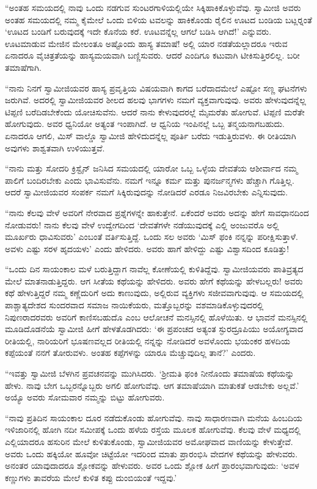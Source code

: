  “ಅಂತಹ ಸಮಯದಲ್ಲಿ ನಾವು ಒಂದು ನಡಗುವ ಸುಂಟರಗಾಳಿಯಲ್ಲಿಯೇ ಸಿಕ್ಕಿಹಾಕಿಕೊಳ್ಳುವೆವು. ಸ್ವಾಮೀಜಿ ಅವರು ಅಂತಹ ಸಮಯದಲ್ಲಿ ನಮ್ಮ ಕೈಮೇಲೆ ಒಂದು ಬಿಳಿಯ ಟವಲನ್ನು ಹಾಕಿಕೊಂಡು ರೈಲಿನ ಊಟದ ಬಂಡಿಯ ಬಟ್ಲರ್‍ನಂತೆ ‘ಊಟದ ಬಂಡಿಗೆ ಬರುವುದಕ್ಕೆ ಇದೇ ಕೊನೆಯ ಕರೆ. ಊಟವನ್ನೆಲ್ಲ ಆಗಲೆ ಬಡಿಸಿ ಆಗಿದೆ!’ ಎನ್ನುವರು. ಊಟಮಾಡುವ ಮೇಜಿನ ಮೇಲಂತೂ ಅಷ್ಟೊಂದು ಹಾಸ್ಯ ತಮಾಷೆ! ಅಲ್ಲಿ ಯಾರ ನಡತೆಯಲ್ಲಾದರೂ ಇರುವ ಏನಾದರೂ ವೈಚಿತ್ರತೆಯನ್ನು ಹಾಸ್ಯಮಯವಾಗಿ ಬಣ್ಣಿಸುವರು. ಆದರೆ ಎಂದಿಗೂ ಕಟುವಾಗಿ ಟೀಕಿಸುತ್ತಿರಲಿಲ್ಲ. ಬರೀ ತಮಾಷೆಗಾಗಿ.

 “ನಾನು ನಿನಗೆ ಸ್ವಾಮೀಜಿಯವರ ಹಾಸ್ಯ ಪ್ರವೃತ್ತಿಯ ವಿಷಯವಾಗಿ ಕಾಗದ ಬರೆದಾದಮೇಲೆ ಎಷ್ಟೋ ಸಣ್ಣ ಘಟನೆಗಳು ಜರುಗಿವೆ. ಅದರಲ್ಲಿ ಸ್ವಾಮೀಜಿಯವರ ಶೀಲದ ಹಲವು ಭಾಗಗಳು ನಮಗೆ ವ್ಯಕ್ತವಾಗುವುವು. ಅವರು ಹೇಳುವುದನ್ನೆಲ್ಲ ಟಿಪ್ಪಣಿ ಬರೆದಿಡಬೇಕೆಂದು ಯೋಚಿಸುವೆನು. ಆದರೆ ನಾನು ಕೇಳುವುದರಲ್ಲೆ ಮೈಮರೆತು ಹೋಗುವೆ. ಟಿಪ್ಪಣಿ ಮರೆತೇ ಹೋಗುವುದು. ಅವರ ಧ್ವನಿಯೋ ಅತ್ಯಂತ ಇಂಪಾಗಿದೆ. ಆ ಧ್ವನಿಯ ಇಂಪಿನಲ್ಲೆ ಒಬ್ಬ ತನ್ಮಯನಾಗಬಹುದು. ಏನಾದರೂ ಆಗಲಿ, ಮಿಸ್ ವಾಲ್ಡೊ ಸ್ವಾಮೀಜಿ ಹೇಳಿದುದನ್ನೆಲ್ಲ ಪೂರ್ತಿ ಬರೆದು ಇಡುತ್ತಿರುವಳು. ಈ ರೀತಿಯಾಗಿ ಅವುಗಳು ಶಾಶ್ವತವಾಗಿ ಉಳಿಯುತ್ತವೆ.

 “ನಾನು ಮತ್ತು ಸೋದರಿ ಕ್ರಿಸ್ಟೈನ್ ಜನಿಸಿದ ಸಮಯದಲ್ಲಿ ಯಾರೋ ಒಬ್ಬ ಒಳ್ಳೆಯ ದೇವತೆಯ ಆಶೀರ್ವಾದ ನಮ್ಮ ಪಾಲಿಗೆ ಬಂದಿರಬೇಕು ಎಂದು ಭಾವಿಸುವೆನು. ನಮಗೆ ಇನ್ನೂ ಕರ್ಮ ಮತ್ತು ಪುನರ್ಜನ್ಮಗಳು ಹೆಚ್ಚಾಗಿ ಗೊತ್ತಿಲ್ಲ. ಆದರೆ ಸ್ವಾಮೀಜಿಯವರ ಸಂಪರ್ಕ ನಮಗೆ ಸಿಕ್ಕಿರುವುದನ್ನು ನೋಡಿದರೆ ಎರಡೂ ನಿಜವಿರಬೇಕು ಎನ್ನಿಸುವುದು.

 “ನಾನು ಕೆಲವು ವೇಳೆ ಅವರಿಗೆ ನೇರವಾದ ಪ್ರಶ್ನೆಗಳನ್ನೇ ಹಾಕುತ್ತೇನೆ. ಏಕೆಂದರೆ ಅವರು ಅದನ್ನು ಹೇಗೆ ಸಾವಧಾನದಿಂದ ನೋಡುವರು! ನಾನು ಕೆಲವು ವೇಳೆ ಉದ್ವೇಗದಿಂದ ‘ದೇವತೆಗಳೇ ನಡೆಯುವುದಕ್ಕೆ ಎಲ್ಲಿ ಅಂಜುವರೊ ಅಲ್ಲಿ ಮೂರ್ಖರು ಧಾವಿಸುವರು’ ಎಂಬಂತೆ ವರ್ತಿಸುತ್ತಿದ್ದೆ. ಒಂದು ಸಲ ಅವರು ‘ಮಿಸ್ ಫಂಕಿ ನನ್ನನ್ನು ಪರೀಕ್ಷಿಸುತ್ತಾಳೆ. ಅವಳು ಎಷ್ಟು ಸರಳ ಹೃದಯಳು’ ಎಂದು ಹೇಳಿದರು. ಅವರು ಹಾಗೆ ಹೇಳಿದ್ದು ಎಷ್ಟು ವಿಶ್ವಾಸದಿಂದ ಕೂಡಿತ್ತು!

 “ಒಂದು ದಿನ ಸಾಯಂಕಾಲ ಮಳೆ ಬರುತ್ತಿದ್ದಾಗ ನಾವೆಲ್ಲ ಕೋಣೆಯಲ್ಲಿ ಕುಳಿತಿದ್ದೆವು. ಸ್ವಾಮೀಜಿಯವರು ಪಾತಿವ್ರತ್ಯದ ಮೇಲೆ ಮಾತನಾಡುತ್ತಿದ್ದರು. ಆಗ ಸೀತೆಯ ಕಥೆಯನ್ನು ಹೇಳಿದರು. ಅವರು ಹೇಗೆ ಕಥೆಯನ್ನು ಹೇಳಬಲ್ಲರು! ಅವರು ಕಥೆ ಹೇಳುತ್ತಿದ್ದರೆ ನಮ್ಮ ಕಣ್ಣೆದುರಿಗೆ ಅದು ಕಾಣುವುದು, ಅಲ್ಲಿರುವ ವ್ಯಕ್ತಿಗಳು ಸಜೀವವಾಗುವುವು. ಆ ಸಮಯದಲ್ಲಿ ಪಾಶ್ಚಾತ್ಯದೇಶದ ಸುಂದರವಾದ ಸಮಾಜ ನಾಯಿಕೆಯರು, ಮತ್ತೊಬ್ಬರನ್ನು ವಶಮಾಡಿಕೊಳ್ಳುವುದರಲ್ಲಿ ನಿಪುಣರಾದರವರು ಅವರಿಗೆ ಕಾಣಿಸಬಹುದೊ ಎಂಬ ಆಲೋಚನೆ ಮನಸ್ಸಿನಲ್ಲಿ ಹೊಳೆಯಿತು. ಆ ಭಾವನೆ ಮನಸ್ಸಿನಲ್ಲಿ ಮೂಡಿದೊಡನೆಯೆ ಸ್ವಾಮೀಜಿ ಹೀಗೆ ಹೇಳತೊಡಗಿದರು: ‘ಈ ಪ್ರಪಂಚದ ಅತ್ಯಂತ ಸ್ಫುರದ್ರೂಪಿಯು ಅಯೋಗ್ಯವಾದ ರೀತಿಯಲ್ಲಿ, ನಾರಿಯರಿಗೆ ಭೂಷಣವಲ್ಲದ ರೀತಿಯಲ್ಲಿ ನನ್ನನ್ನು ನೋಡಿದರೆ ಅವಳೊಂದು ಭಯಂಕರ ಹಳದಿಯ ಕಪ್ಪೆಯಂತೆ ನನಗೆ ತೋರುವಳು. ಅಂತಹ ಕಪ್ಪೆಗಳನ್ನು ಯಾರೂ ಮೆಚ್ಚುವುದಿಲ್ಲ ತಾನೆ?’ ಎಂದರು.

 “ಇವತ್ತು ಸ್ವಾಮೀಜಿ ಬೆಳಗಿನ ಪ್ರವಚನವನ್ನು ಮುಗಿಸಿದರು. ‘ಶ‍್ರೀಮತಿ ಫಂಕಿ ನೀನೊಂದು ತಮಾಷೆಯ ಕಥೆಯನ್ನು ಹೇಳು. ನಾವು ಬೇಗ ಒಬ್ಬರನ್ನೊಬ್ಬರು ಅಗಲಿ ಹೋಗುವೆವು. ಆಗ ತಮಾಷೆಯಾಗಿ ಮಾತುಕತೆ ಆಡಬೇಕು ಅಲ್ಲವೆ.’ ಅಯ್ಯೊ ಅವರು ಸೋಮವಾರ ನಮ್ಮನ್ನು ಬಿಟ್ಟು ಹೋಗುವರು.

 “ನಾವು ಪ್ರತಿದಿನ ಸಾಯಂಕಾಲ ದೂರ ನಡೆದುಕೊಂಡು ಹೋಗುವೆವು. ನಾವು ಸಾಧಾರಣವಾಗಿ ಮನೆಯ ಹಿಂಬದಿಯ ಇಳಿಜಾರಿನಲ್ಲಿ ಹೋಗಿ ನದೀ ಸಮೀಪಕ್ಕೆ ಒಂದು ಹಳೆಯ ರಸ್ತೆಯ ಮೂಲಕ ಹೋಗುವೆವು. ಕೆಲವು ವೇಳೆ ಮಧ್ಯದಲ್ಲಿ ಎಲ್ಲಿಯಾದರೂ ಹಸುರಿನ ಮೇಲೆ ಕುಳಿತುಕೊಂಡು, ಸ್ವಾಮೀಜಿಯವರ ಅಮೋಘವಾದ ವಾಣಿಯನ್ನು ಕೇಳುತ್ತೇವೆ. ಅವರು ಒಂದು ಹಕ್ಕಿಯೋ ಹೂವೋ ಚಿಟ್ಟೆಯೋ ಇದರಿಂದ ಮಾತು ಪ್ರಾರಂಭಿಸಿ ವೇದಗಳ ಕಥೆಯನ್ನು ಹೇಳುವರು. ಅನಂತರ ಯಾವುದಾದರೂ ಶ್ಲೋಕವನ್ನು ಹೇಳುವರು. ಅವರ ಒಂದು ಶ್ಲೋಕ ಹೀಗೆ ಪ್ರಾರಂಭವಾಗುವುದು: ‘ಅವಳ ಕಣ್ಣುಗಳು ತಾವರೆಯ ಮೇಲೆ ಕುಳಿತ ಕಪ್ಪು ದುಂಬಿಯಂತೆ ಇದ್ದವು.’

